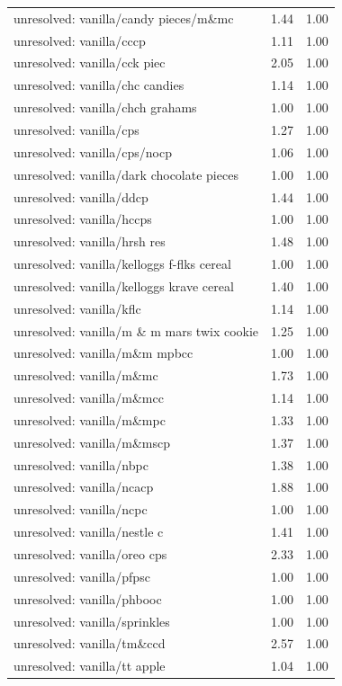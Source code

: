 \begin{table}
\begin{tabular}{lrr}
unresolved: vanilla/candy pieces/m\&mc & 1.44 & 1.00 \\
unresolved: vanilla/cccp & 1.11 & 1.00 \\
unresolved: vanilla/cck piec & 2.05 & 1.00 \\
unresolved: vanilla/chc candies & 1.14 & 1.00 \\
unresolved: vanilla/chch grahams & 1.00 & 1.00 \\
unresolved: vanilla/cps & 1.27 & 1.00 \\
unresolved: vanilla/cps/nocp & 1.06 & 1.00 \\
unresolved: vanilla/dark chocolate pieces & 1.00 & 1.00 \\
unresolved: vanilla/ddcp & 1.44 & 1.00 \\
unresolved: vanilla/hccps & 1.00 & 1.00 \\
unresolved: vanilla/hrsh res & 1.48 & 1.00 \\
unresolved: vanilla/kelloggs f-flks cereal & 1.00 & 1.00 \\
unresolved: vanilla/kelloggs krave cereal & 1.40 & 1.00 \\
unresolved: vanilla/kflc & 1.14 & 1.00 \\
unresolved: vanilla/m \& m mars twix cookie & 1.25 & 1.00 \\
unresolved: vanilla/m\&m mpbcc & 1.00 & 1.00 \\
unresolved: vanilla/m\&mc & 1.73 & 1.00 \\
unresolved: vanilla/m\&mcc & 1.14 & 1.00 \\
unresolved: vanilla/m\&mpc & 1.33 & 1.00 \\
unresolved: vanilla/m\&mscp & 1.37 & 1.00 \\
unresolved: vanilla/nbpc & 1.38 & 1.00 \\
unresolved: vanilla/ncacp & 1.88 & 1.00 \\
unresolved: vanilla/ncpc & 1.00 & 1.00 \\
unresolved: vanilla/nestle c & 1.41 & 1.00 \\
unresolved: vanilla/oreo cps & 2.33 & 1.00 \\
unresolved: vanilla/pfpsc & 1.00 & 1.00 \\
unresolved: vanilla/phbooc & 1.00 & 1.00 \\
unresolved: vanilla/sprinkles & 1.00 & 1.00 \\
unresolved: vanilla/tm\&ccd & 2.57 & 1.00 \\
unresolved: vanilla/tt apple & 1.04 & 1.00 \\

\end{tabular}
\end{table}
